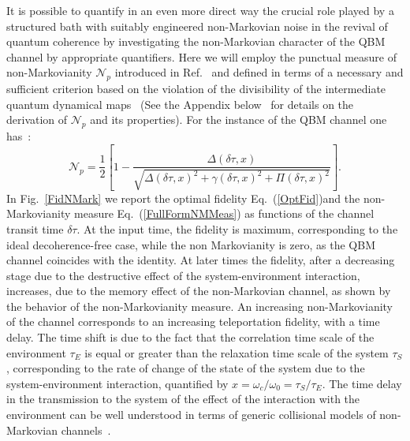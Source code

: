 \documentclass[prl,twocolumn,aps,floatfix,showpacs,tightenlines,superscriptaddress,amsmath,amssymb,amsfonts,10pt]{revtex4-1}
\begin{document}
It is possible to quantify in an even more direct way the crucial role played by a structured bath with suitably engineered non-Markovian noise in the revival of quantum coherence by investigating the non-Markovian character of the QBM channel by appropriate quantifiers. Here we will employ the punctual measure of non-Markovianity $\mathcal{N}_p$ introduced in Ref.~\cite{PhysRevLett.115.070401} and defined in terms of a necessary and sufficient criterion based on the violation of the divisibility of the intermediate quantum dynamical maps~\cite{PhysRevLett.115.070401} (See the Appendix below~\cite{SuppMat} for details on the derivation of $\mathcal{N}_p$ and its properties). For the instance of the QBM channel one has~\cite{TorreAsym2017}:
\begin{equation} \label{FullFormNMMeas}
\mathcal{N}_p \!=\! \dfrac{1}{2}\left[1-\dfrac{\Delta(\delta\tau,x)}{\sqrt{\Delta(\delta\tau,x)^2+\gamma(\delta\tau,x)^2+\Pi(\delta\tau,x)^2}}\right].
\end{equation}
In Fig.~\ref{FidNMark} we report the optimal fidelity Eq.~(\ref{OptFid})and the non-Markovianity measure Eq.~(\ref{FullFormNMMeas}) as functions of the channel transit time $\delta\tau$. At the input time, the fidelity is maximum, corresponding to the ideal decoherence-free case, while the non Markovianity is zero, as the QBM channel coincides with the identity. At later times the fidelity, after a decreasing stage due to the destructive effect of the system-environment interaction, increases, due to the memory effect of the non-Markovian channel, as shown by the behavior of the non-Markovianity measure. An increasing  non-Markovianity of the channel corresponds to an increasing teleportation fidelity, with a time delay. The time shift is due to the fact that the correlation time scale of the environment $\tau_E$ is equal or greater than the relaxation time scale of the system $\tau_S$, corresponding to the rate of change of the state of the system due to the system-environment interaction, quantified by $x=\omega_c / \omega_0 = \tau_S / \tau_E$. The time delay in the transmission to the system of the effect of the interaction with the environment can be well understood in terms of generic collisional models of non-Markovian channels~\cite{PhysRevA.87.040103}.
\end{document}
